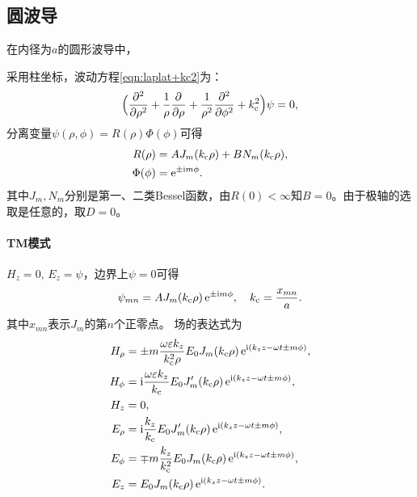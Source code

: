\subsection{圆波导}

在内径为$a$的圆形波导中，
\begin{center}
    \label{fig:circle waveguide}
\end{center}
采用柱坐标，波动方程\eqref{eqn:laplat+kc2}为：
\begin{equation}
    \Bigkh{\pp[2]\rho+\frac1\rho\pp\rho+\frac1{\rho^2}\pp[2]\phi+k\c^2}\psi=0,
\end{equation}
分离变量$\psi(\rho,\phi)=R(\rho)\Phi(\phi)$可得
\begin{align*}
    R(\rho)&=AJ_m(k\c\rho)+BN_m(k\c\rho),\\
    \Phi(\phi)&=\e{\pm\i m\phi}.
\end{align*}
其中$J_m,N_m$分别是第一、二类Bessel函数，由$R(0)<\infty$知$B=0$。由于极轴的选取是任意的，取$D=0$。

\paragraph{TM模式}

$H_z=0,\,E_z=\psi$，边界上$\psi=0$可得
\begin{equation}
    \psi_{mn}=AJ_m(k\c\rho)\e{\pm\i m\phi},\quad k\c=\frac{x_{mn}}a.
\end{equation}
其中$x_{mn}$表示$J_m$的第$n$个正零点。
场的表达式为
\begin{subequations}
    \begin{align*}
        H_\rho&=\pm m\frac{\omega\varepsilon k_z}{k\c^2\rho}E_0J_m(k\c\rho)\e{\i(k_zz-\omega t\pm m\phi)},\\
        H_\phi&=\i\frac{\omega\varepsilon k_z}{k\c}E_0J_m'(k\c\rho)\e{\i(k_zz-\omega t\pm m\phi)},\\
        H_z&=0,\\
        E_\rho&=\i\frac{k_z}{k\c}E_0J_m'(k\c\rho)\e{\i(k_zz-\omega t\pm m\phi)},\\
        E_\phi&=\mp m\frac{k_z}{k\c^2}E_0J_m(k\c\rho)\e{\i(k_zz-\omega t\pm m\phi)},\\
        E_z&=E_0J_m(k\c\rho)\e{\i(k_zz-\omega t\pm m\phi)}.
    \end{align*}
\end{subequations}

